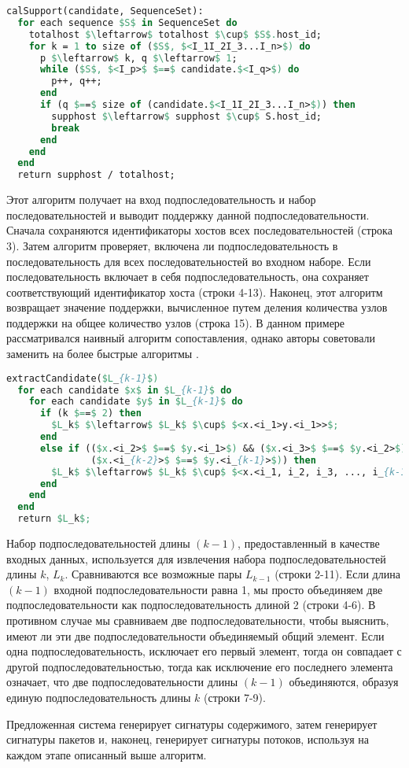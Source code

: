 \begin{lstlisting}[language=Pascal, caption=Алгоритм вычисления поддержки, mathescape]
calSupport(candidate, SequenceSet):
  for each sequence $S$ in SequenceSet do
    totalhost $\leftarrow$ totalhost $\cup$ $S$.host_id;
    for k = 1 to size of ($S$, $<I_1I_2I_3...I_n>$) do
      p $\leftarrow$ k, q $\leftarrow$ 1;
      while ($S$, $<I_p>$ $==$ candidate.$<I_q>$) do
        p++, q++;
      end
      if (q $==$ size of (candidate.$<I_1I_2I_3...I_n>$)) then
        supphost $\leftarrow$ supphost $\cup$ S.host_id;
        break
      end
    end
  end
  return supphost / totalhost;
\end{lstlisting}

Этот алгоритм получает на вход подпоследовательность и набор последовательностей и выводит поддержку данной подпоследовательности.
Сначала сохраняются идентификаторы хостов всех последовательностей (строка 3).
Затем алгоритм проверяет, включена ли подпоследовательность в последовательность для всех последовательностей во входном наборе.
Если последовательность включает в себя подпоследовательность, она сохраняет соответствующий идентификатор хоста (строки 4-13).
Наконец, этот алгоритм возвращает значение поддержки, вычисленное путем деления количества узлов поддержки на общее количество узлов (строка 15).
В данном примере рассматривался наивный алгоритм сопоставления, однако авторы советовали заменить на более быстрые алгоритмы
\cite{karp1987efficient,boyer1977fast,xie2010improved,zhou2019research}.

\begin{lstlisting}[language=Pascal, caption=Алгоритм извлечения кандидата, mathescape]
extractCandidate($L_{k-1}$)
  for each candidate $x$ in $L_{k-1}$ do
    for each candidate $y$ in $L_{k-1}$ do
      if (k $==$ 2) then
        $L_k$ $\leftarrow$ $L_k$ $\cup$ $<x.<i_1>y.<i_1>>$;
      end
      else if (($x.<i_2>$ $==$ $y.<i_1>$) && ($x.<i_3>$ $==$ $y.<i_2>$) && ...
               ($x.<i_{k-2}>$ $==$ $y.<i_{k-1}>$)) then
        $L_k$ $\leftarrow$ $L_k$ $\cup$ $<x.<i_1, i_2, i_3, ..., i_{k-1}>y.<i_{k-1}>$;
      end
    end
  end
  return $L_k$;
\end{lstlisting}

Набор подпоследовательностей длины $(k-1)$, предоставленный в качестве входных данных, используется для извлечения набора подпоследовательностей длины $k$, $L_k$.
Сравниваются все возможные пары $L_{k-1}$ (строки 2-11).
Если длина $(k-1)$ входной подпоследовательности равна 1, мы просто объединяем две подпоследовательности как подпоследовательность длиной 2 (строки 4-6).
В противном случае мы сравниваем две подпоследовательности, чтобы выяснить, имеют ли эти две подпоследовательности объединяемый общий элемент.
Если одна подпоследовательность, исключает его первый элемент, тогда он совпадает с другой подпоследовательностью,
тогда как исключение его последнего элемента означает, что две подпоследовательности длины $(k-1)$ объединяются, образуя единую подпоследовательность длины $k$ (строки 7-9).

Предложенная система генерирует сигнатуры содержимого, затем генерирует сигнатуры пакетов и, наконец, генерирует сигнатуры потоков, используя на каждом этапе описанный выше алгоритм.


\newpage
